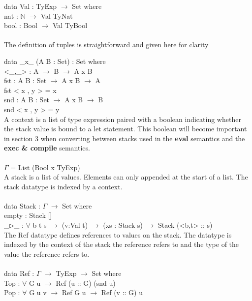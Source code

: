 \documentclass[paper=a4, fontsize=11pt]{scrartcl} %
\numberwithin{equation}{section} %
\numberwithin{figure}{section} %
\numberwithin{table}{section} %
\begin{document}
data Val : TyExp $\rightarrow$ Set where\\
\hspace*{5mm}nat : $\mathbb{N}$ $\rightarrow$ Val TyNat\\
\hspace*{5mm}bool : Bool $\rightarrow$ Val TyBool\\
  \\
\normalfont
The definition of tuples is straightforward and given here for clarity \\
\ttfamily

data \_x\_ (A B : Set) : Set where\\
\hspace*{5mm}<\_,\_> : A $\rightarrow$ B $\rightarrow$ A x B\\

fst : {A B : Set} $\rightarrow$ A x B $\rightarrow$ A\\
fst < x , y > = x\\

snd : {A B : Set} $\rightarrow$ A x B $\rightarrow$ B\\
snd < x , y > = y\\

\normalfont
A context is a list of type expression paired with a boolean indicating whether the stack value is bound to a \ttfamily let \normalfont statement. This boolean will become important in section 3 when converting between stacks used in the \textbf{eval} semantics and the \textbf{exec \& compile} semantics.  \\
\ttfamily
\\
$\Gamma$ = List (Bool x TyExp)\\

\normalfont
A stack is a list of values. Elements can only appended at the start of a list. The stack datatype is indexed by a context.\\
\ttfamily
\\
data Stack : $\Gamma$ $\rightarrow$ Set where\\
\hspace*{5mm}empty : Stack []\\
\hspace*{5mm}\_$\rhd$\_ : $\forall$ {b t s} $\rightarrow$ (v:Val t) $\rightarrow$ (xs : Stack s) $\rightarrow$ Stack (<b,t> :: s)\\
  
\normalfont
The \ttfamily Ref \normalfont datatype defines references to values on the stack. The datatype is indexed by the context of the stack the reference refers to and the type of the value the reference refers to.\\
\ttfamily
\\
data Ref : $\Gamma$ $\rightarrow$ TyExp $\rightarrow$ Set where\\
\hspace*{5mm}Top : $\forall$ {G u} $\rightarrow$ Ref (u :: G) (snd u)\\
\hspace*{5mm}Pop : $\forall$ {G u v} $\rightarrow$ Ref G u $\rightarrow$ Ref (v :: G) u\\
\normalfont
\end{document}

